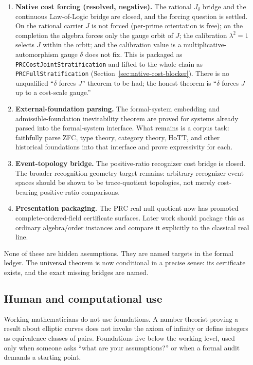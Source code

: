 \documentclass[11pt,a4paper]{article}
\theoremstyle{definition}
\theoremstyle{remark}
\begin{document}
\begin{enumerate}[leftmargin=2em]
\item[\textbf{0.}] \textbf{Native cost forcing (resolved, negative).} The
  rational $J_\delta$ bridge and the continuous Law-of-Logic bridge are closed,
  and the forcing question is settled. On the rational carrier $J$ is not forced
  (per-prime orientation is free); on the completion the algebra forces only the
  gauge orbit of $J$; the calibration $\lambda^2 = 1$ selects $J$ within the
  orbit; and the calibration value is a multiplicative-automorphism gauge
  $\delta$ does not fix. This is packaged as
  \texttt{PRCCostJointStratification} and lifted to the whole chain as
  \texttt{PRCFullStratification} (Section~\ref{sec:native-cost-blocker}). There is
  no unqualified ``$\delta$ forces $J$'' theorem to be had; the honest theorem is
  ``$\delta$ forces $J$ up to a cost-scale gauge.''
\item \textbf{External-foundation parsing.} The formal-system embedding and
  admissible-foundation inevitability theorem are proved for systems already
  parsed into the formal-system interface. What remains is a corpus task:
  faithfully parse ZFC, type theory, category theory, HoTT, and other
  historical foundations into that interface and prove expressivity for each.
\item \textbf{Event-topology bridge.} The positive-ratio recognizer cost
  bridge is closed. The broader recognition-geometry target remains: arbitrary
  recognizer event spaces should be shown to be trace-quotient topologies, not
  merely cost-bearing positive-ratio comparisons.
\item \textbf{Presentation packaging.} The PRC real null quotient now has
  promoted complete-ordered-field certificate surfaces. Later work should
  package this as ordinary algebra/order instances and compare it explicitly
  to the classical real line.
\end{enumerate}

None of these are hidden assumptions. They are named targets in the formal
ledger. The universal theorem is now conditional in a precise sense: its
certificate exists, and the exact missing bridges are named.

\subsection{Human and computational use}

Working mathematicians do not use foundations. A number theorist proving a
result about elliptic curves does not invoke the axiom of infinity or define
integers as equivalence classes of pairs. Foundations live below the working
level, used only when someone asks ``what are your assumptions?'' or when a
formal audit demands a starting point.
\end{document}
